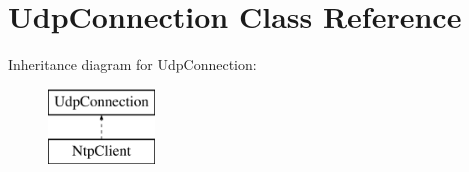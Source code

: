 \hypertarget{class_udp_connection}{}\section{Udp\+Connection Class Reference}
\label{class_udp_connection}
Inheritance diagram for Udp\+Connection\+:\begin{figure}[H]
\begin{center}
\leavevmode
\includegraphics[height=2.000000cm]{class_udp_connection}
\end{center}
\end{figure}
